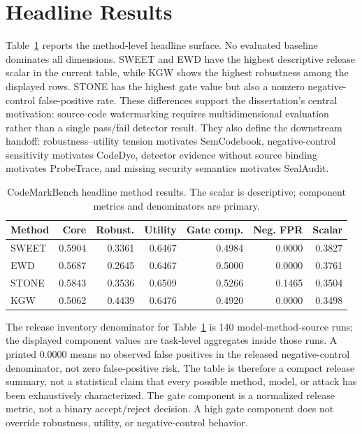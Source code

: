 \section{Headline Results}

Table~\ref{tab:codemarkbench-leaderboard} reports the method-level headline surface. No evaluated baseline dominates all dimensions. SWEET and EWD have the highest descriptive release scalar in the current table, while KGW shows the highest robustness among the displayed rows. STONE has the highest gate value but also a nonzero negative-control false-positive rate. These differences support the dissertation's central motivation: source-code watermarking requires multidimensional evaluation rather than a single pass/fail detector result. They also define the downstream handoff: robustness--utility tension motivates SemCodebook, negative-control sensitivity motivates CodeDye, detector evidence without source binding motivates ProbeTrace, and missing security semantics motivates SealAudit.

\begin{table}[htbp]
\centering
\caption{CodeMarkBench headline method results. The scalar is descriptive; component metrics and denominators are primary.}
\label{tab:codemarkbench-leaderboard}
\compacttable
\begin{tabular}{@{}lrrrrrr@{}}
\toprule
\textbf{Method} & \textbf{Core} & \textbf{Robust.} & \textbf{Utility} & \textbf{Gate comp.} & \textbf{Neg. FPR} & \textbf{Scalar} \\
\midrule
SWEET & 0.5904 & 0.3361 & 0.6467 & 0.4984 & 0.0000 & 0.3827 \\
EWD & 0.5687 & 0.2645 & 0.6467 & 0.5000 & 0.0000 & 0.3761 \\
STONE & 0.5843 & 0.3536 & 0.6509 & 0.5266 & 0.1465 & 0.3504 \\
KGW & 0.5062 & 0.4439 & 0.6476 & 0.4920 & 0.0000 & 0.3498 \\
\bottomrule
\end{tabular}
\end{table}

The release inventory denominator for Table~\ref{tab:codemarkbench-leaderboard} is 140 model-method-source runs; the displayed component values are task-level aggregates inside those runs. A printed 0.0000 means no observed false positives in the released negative-control denominator, not zero false-positive risk. The table is therefore a compact release summary, not a statistical claim that every possible method, model, or attack has been exhaustively characterized.
The gate component is a normalized release metric, not a binary accept/reject decision. A high gate component does not override robustness, utility, or negative-control behavior.

